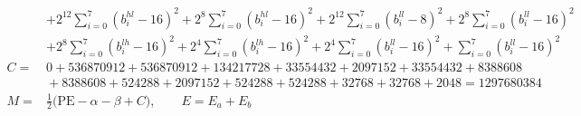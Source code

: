 \documentclass[fleqn]{article}
\begin{document}
\[{\begin{aligned}
  & + 2^{12}\!\sum_{i=0}^{7}(b_i^{hl}{-}16)^2 + 2^{8}\!\sum_{i=0}^{7}(b_i^{hl}{-}16)^2 + 2^{12}\!\sum_{i=0}^{7}(b_i^{ll}{-}8)^2 + 2^{8}\!\sum_{i=0}^{7}(b_i^{ll}{-}16)^2 \\
  & + 2^{8}\!\sum_{i=0}^{7}(b_i^{lh}{-}16)^2 + 2^{4}\!\sum_{i=0}^{7}(b_i^{lh}{-}16)^2 + 2^{4}\!\sum_{i=0}^{7}(b_i^{ll}{-}16)^2 + \sum_{i=0}^{7}(b_i^{ll}{-}16)^2 \\[0.5em]
C ={}& 0 + 536870912 + 536870912 + 134217728 + 33554432 + 2097152 + 33554432 + 8388608 \\
  & {}+ 8388608 + 524288 + 2097152 + 524288 + 524288 + 32768 + 32768 + 2048 = 1297680384 \\[0.3em]
M ={}& \tfrac12\big(\mathrm{PE} - \alpha - \beta + C\big), \qquad E = E_a + E_b
\end{aligned}
\;}
\]
\end{document}
